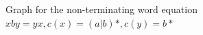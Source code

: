 \begin{figure} \label{fig:hangup}
\begin{center}
\caption{Graph for the non-terminating word equation $xby = yx, c(x) = (a|b)*, c(y) = b*$}
\label{fig:barplot-2-without-1}
\end{center}
\end{figure}
